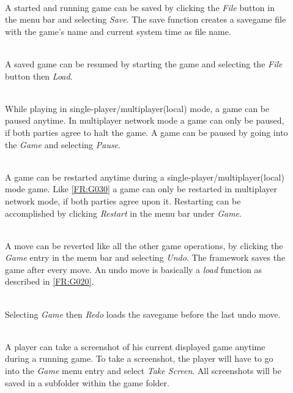 \begin{description}
	\item[] \textbf{} \\
   	A started and running game can be saved by clicking the \emph{File} button in the menu bar and selecting \emph{Save}. The save function creates a \gls{savegame} file with the game's name and current system time as file name.
   	\item[] \textbf{} \\
   	A saved game can be resumed by starting the game and selecting the \emph{File} button then \emph{Load}.
   	\item[] \textbf{} \\
   	While playing in single-player/multiplayer(local) mode, a game can be paused anytime. In multiplayer network mode a game can only be paused, if both parties agree to halt the game. A game can be paused by going into the \emph{Game} and selecting \emph{Pause}.
	\item[] \textbf{} \\
	A game can be restarted anytime during a single-player/multiplayer(local) mode game. Like \ref{FR:G030} a game can only be restarted in multiplayer network mode, if both parties agree upon it. Restarting can be accomplished by clicking \emph{Restart} in the menu bar under \emph{Game}.
	\item[] \textbf{} \\
	A move can be reverted like all the other game operations, by clicking the \emph{Game} entry in the menu bar and selecting \emph{Undo}. The \graphioli framework saves the game after every move. An undo move is basically a \emph{load} function as described in \ref{FR:G020}.
	\item[] \textbf{} \\
	Selecting \emph{Game} then \emph{Redo} loads the savegame before the last undo move.
	\item[] \textbf{} \\
	A player can take a screenshot of his current displayed game anytime during a running game. To take a screenshot, the player will have to go into the \emph{Game} menu entry and select \emph{Take Screen}. All screenshots will be saved in a subfolder within the game folder.
\end{description}

